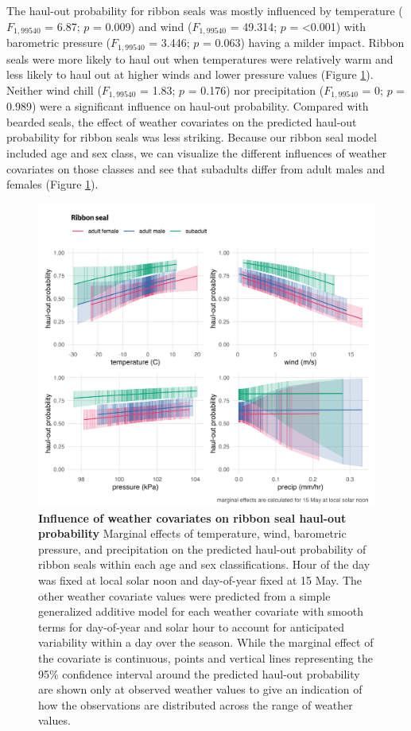 \documentclass[fleqn,10pt,lineno]{wlpeerj} %
\begin{document}
The haul-out probability for ribbon seals was mostly influenced by
temperature
(\(F_{1,99540}\)
= 6.87; \(p\) = 0.009) and wind
(\(F_{1,99540}\)
= 49.314; \(p\) = \textless0.001) with barometric pressure
(\(F_{1,99540}\)
= 3.446; \(p\) =
0.063) having a milder impact.
Ribbon seals were more likely to haul out when temperatures were
relatively warm and less likely to haul out at higher winds and lower pressure
values (Figure \ref{fig:ribbonHOwx}). Neither wind chill
(\(F_{1,99540}\)
= 1.83; \(p\) =
0.176) nor precipitation
(\(F_{1,99540}\)
= 0; \(p\) =
0.989) were a significant
influence on haul-out probability. Compared with bearded seals, the effect of
weather covariates on the predicted haul-out probability for
ribbon seals was less striking. Because our ribbon seal model included age and sex class, we can
visualize the different influences of weather covariates on those classes and see
that subadults differ from adult males and females (Figure \ref{fig:ribbonHOwx}).



\begin{figure}
\includegraphics[width=1\linewidth]{../figures/ribbonHOwx-1} \caption{\textbf{Influence of weather covariates on ribbon seal haul-out probability} \linebreak Marginal effects of temperature, wind, barometric pressure, and precipitation on the predicted haul-out probability of ribbon seals within each age and sex classifications. Hour of the day was fixed at local solar noon and day-of-year fixed at 15 May. The other weather covariate values were predicted from a simple generalized additive model for each weather covariate with smooth terms for day-of-year and solar hour to account for anticipated variability within a day over the season. While the marginal effect of the covariate is continuous, points and vertical lines representing the 95\% confidence interval around the predicted haul-out probability are shown only at observed weather values to give an indication of how the observations are distributed across the range of weather values.}\label{fig:ribbonHOwx}
\end{figure}
\end{document}
